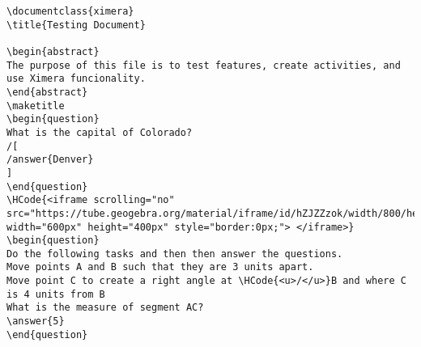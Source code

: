 \begin{Verbatim}
\documentclass{ximera}
\title{Testing Document}

\begin{abstract}
The purpose of this file is to test features, create activities, and use Ximera funcionality.
\end{abstract}
\maketitle
\begin{question}
What is the capital of Colorado?
/[
/answer{Denver}
]
\end{question}
\HCode{<iframe scrolling="no" src="https://tube.geogebra.org/material/iframe/id/hZJZZzok/width/800/height/600/border/888888/rc/false/ai/false/sdz/true/smb/false/stb/false/stbh/true/ld/false/sri/true/at/auto" width="600px" height="400px" style="border:0px;"> </iframe>}
\begin{question}
Do the following tasks and then then answer the questions.
Move points A and B such that they are 3 units apart.
Move point C to create a right angle at \HCode{<u>/</u>}B and where C is 4 units from B
What is the measure of segment AC?
\answer{5}
\end{question}

\end{Verbatim}

